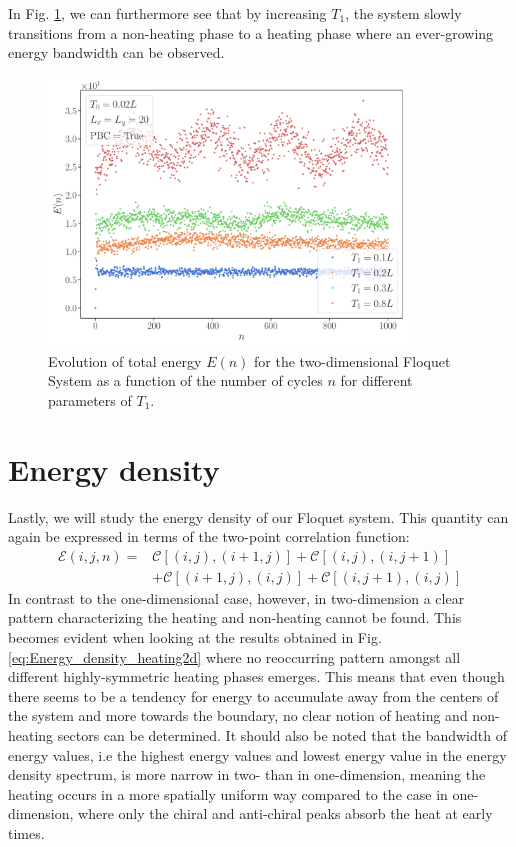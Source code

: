 \documentclass[11pt, a4paper, oneside]{book}
\theoremstyle{definition} %
\begin{document}
In Fig. \ref{Evolution_total_energy_differentT1}, we can furthermore see that by increasing $T_1$, the system slowly transitions from a non-heating phase to a heating phase where an ever-growing energy bandwidth can be observed.
\begin{figure}[h]
\centering
\includegraphics[width = 0.85\textwidth]{TotalEnergyNonHeating2d_Multiple}
\caption{Evolution of total energy $E(n)$ for the two-dimensional Floquet System as a function of the number of cycles $n$ for different parameters of $T_1$. }
\label{Evolution_total_energy_differentT1}
\end{figure}



\section{Energy density}
Lastly, we will study the energy density of our Floquet system. This quantity can again be expressed in terms of the two-point correlation function: 
\begin{equation}
\begin{split}
	\mathcal{E}(i,j,n) =  & \mathcal{C}[(i,j),(i+1,j)] + \mathcal{C}[(i,j), (i, j+1)] \\
 &+ \mathcal{C}[(i+1,j),(i,j)] + \mathcal{C}[(i,j+1), (i,j)]
\end{split}
\end{equation}
In contrast to the one-dimensional case, however, in two-dimension a clear pattern characterizing the heating and non-heating cannot be found.  This becomes evident when looking at the results obtained in Fig. \ref{eq:Energy_density_heating2d} where no reoccurring pattern amongst all different highly-symmetric heating phases emerges. This means that even though there seems to be a tendency for energy to accumulate away from the centers of the system and more towards the boundary, no clear notion of heating and non-heating sectors can be determined. It should also be noted that the bandwidth of energy values, i.e the highest energy values and lowest energy value in the energy density spectrum, is more narrow in two- than in one-dimension, meaning the heating occurs in a more spatially uniform way compared to the case in one-dimension, where only the chiral and anti-chiral peaks absorb the heat at early times. \\
\end{document}
